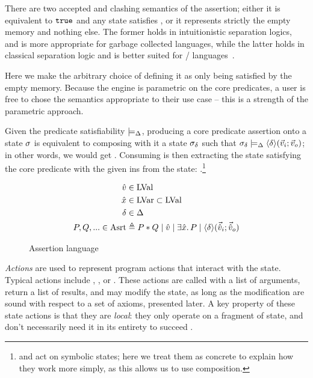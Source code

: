 \begin{remark}
There are two accepted and clashing semantics of the \emp{} assertion; either it is equivalent to $\texttt{true}$ and any state satisfies \emp{}, or it represents strictly the empty memory and nothing else. The former holds in intuitionistic separation logics, and is more appropriate for garbage collected languages, while the latter holds in classical separation logic and is better suited for \alloc/\free{} languages~\cite{sljungle}.

Here we make the arbitrary choice of defining it as only being satisfied by the empty memory. Because the engine is parametric on the core predicates, a user is free to chose the semantics appropriate to their use case -- this is a strength of the parametric approach.
\end{remark}

Given the predicate satisfiability $\models_{\Delta}$, producing a core predicate assertion \corepred{\delta}{\ins}{\outs} onto a state $\sigma$ is equivalent to composing with it a state $\sigma_\delta$ such that $\sigma_\delta\models_{\Delta}\left<\delta\right>\!(\vec{v}_i;\vec{v}_o)$; in other words, we would get \ppprod{\st,\delta,\ins,\outs}{\st\cdot\st_\delta}. Consuming is then extracting the state satisfying the core predicate with the given ins from the state: \ppcons{\st\cdot\st_\delta,\delta,\ins}{\Ok,\st,\outs}.\footnote{\consume{} and \produce{} act on symbolic states; here we treat them as concrete to explain how they work more simply, as this allows us to use composition.}

\begin{figure}
	\begin{align*}
	\hat{v} &\in \text{LVal}\\
	\hat{x} &\in \text{LVar} \subset \text{LVal}\\
	\delta &\in \Delta \\
	P, Q, ... \in \text{Asrt} &\triangleq P * Q \mid \hat{v} \mid \exists \hat{x} \ldotp P \mid \left<\delta\right>\!(\vec{\hat{v}}_i;\vec{\hat{v}}_o)
	\end{align*}
	\caption{Assertion language}
	\label{fig:assertion-language}
\end{figure}

\emph{Actions} are used to represent program actions that interact with the state. Typical actions include \load{}, \store{}, \alloc{} or \free. These actions are called with a list of arguments, return a list of results, and may modify the state, as long as the modification are sound with respect to a set of axioms, presented later. A key property of these state actions is that they are \emph{local}: they only operate on a fragment of state, and don't necessarily need it in its entirety to succeed \cite{abstractseplogic}.

